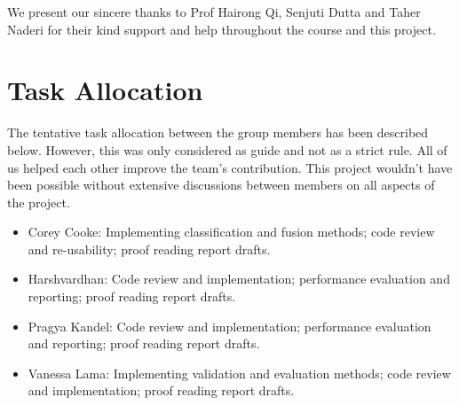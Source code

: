 \documentclass{article}
\begin{document}
We present our sincere thanks to Prof Hairong Qi, Senjuti Dutta and Taher Naderi for their kind support and help throughout the course and this project.

\section*{Task Allocation}
The tentative task allocation between the group members has been described below. However, this was only considered as guide and not as a strict rule. All of us helped each other improve the team's contribution. This project wouldn't have been possible without extensive discussions between members on all aspects of the project.
\begin{itemize}
    \item Corey Cooke: Implementing classification and fusion methods; code review and re-usability; proof reading report drafts.
    \item Harshvardhan: Code review and implementation; performance evaluation and reporting; proof reading report drafts.
    \item Pragya Kandel: Code review and implementation; performance evaluation and reporting; proof reading report drafts.
    \item Vanessa Lama: Implementing validation and evaluation methods; code review and implementation; proof reading report drafts.
\end{itemize}




\end{document}

